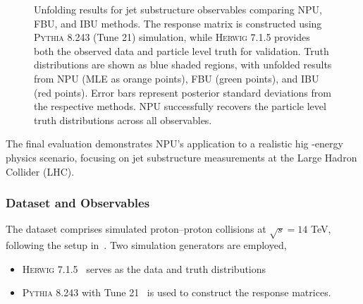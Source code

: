 \begin{figure}
\caption[Jet substructure unfolding results using NPU, FBU, and IBU]{Unfolding results for jet substructure observables comparing NPU, FBU, and IBU methods.
The response matrix is constructed using \textsc{Pythia} 8.243 (Tune 21) simulation, while \textsc{Herwig} 7.1.5 provides both the observed data and particle level truth for validation.
%
Truth distributions are shown as blue shaded regions, with unfolded results from NPU (MLE as orange points), FBU (green points), and IBU (red points).
%
Error bars represent posterior standard deviations from the respective methods.
%
NPU successfully recovers the particle level truth distributions across all observables.\footnotemark
}
\label{fig:substructure}
\end{figure}

    The final evaluation demonstrates NPU's application to a realistic hig -energy physics scenario, focusing on jet substructure measurements at the Large Hadron Collider (LHC).
    \subsubsection{Dataset and Observables}
        The dataset comprises simulated proton--proton collisions at $\sqrt{s} = 14$ TeV, following the setup in~\cite{andreassen_omnifold_2020}.
        Two simulation generators are employed,
        \begin{itemize}
            \item \textsc{Herwig 7.1.5}~\cite{Bellm2017HerwigNote} serves as the data and truth distributions
            \item \textsc{Pythia 8.243} with Tune 21~\cite{bierlich_comprehensive_2022} is used to construct the response matrices.
        \end{itemize}
        
